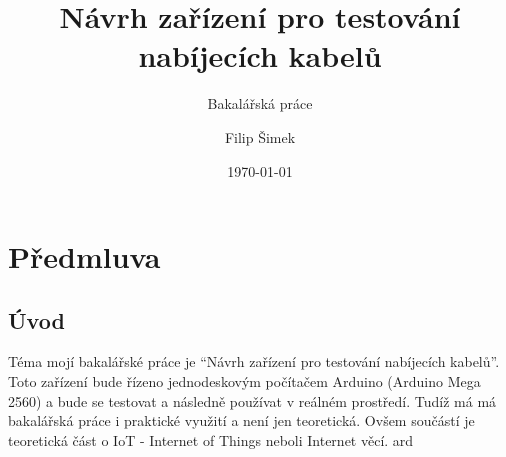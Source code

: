 \documentclass[12pt,a4paper,titlepage]{scrreprt}
\title{\vspace{6cm}Návrh zařízení pro testování nabíjecích kabelů}
\subtitle{Bakalářská práce}
\author{Filip Šimek}
\date{\today}
\newcommand{\ardMeg}{Arduino Mega 2560}
\begin{document}
	
	

	\setcounter{page}{6}
	
	\tableofcontents
	\thispagestyle{empty}
	
	
	\chapter{Předmluva}
	\section {Úvod}
	Téma mojí bakalářské práce je “Návrh zařízení pro testování nabíjecích kabelů”. Toto zařízení bude řízeno jednodeskovým počítačem Arduino (\ardMeg) a bude se testovat a následně používat v reálném prostředí. Tudíž má má bakalářská práce i praktické využití a není jen teoretická. Ovšem součástí je teoretická část o IoT - Internet of Things neboli Internet věcí. \gls{ard}
	
	\printglossary
	
\end{document}
